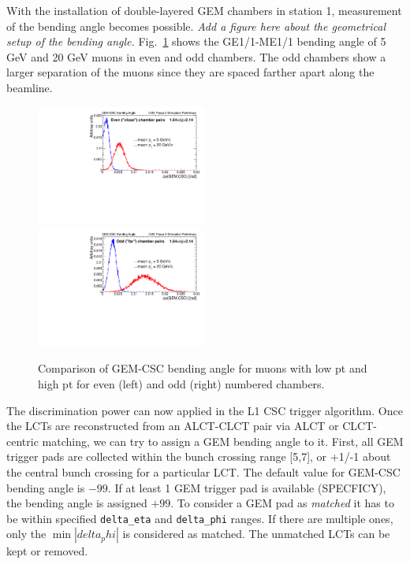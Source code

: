 With the installation of double-layered GEM chambers in station 1, measurement of the bending angle becomes possible. \textit{Add a figure here about the geometrical setup of the bending angle.} Fig.~\ref{fig:GEMCSCdPhi_chambers_reverse} shows the GE1/1-ME1/1 bending angle of 5 GeV and 20 GeV muons in even and odd chambers. The odd chambers show a larger separation of the muons since they are spaced farther apart along the beamline.

\begin{figure}[htb]
\includegraphics[width=0.5\textwidth]{figures/GEMCSCdPhi_even_chambers_reverse.pdf}
\includegraphics[width=0.5\textwidth]{figures/GEMCSCdPhi_odd_chambers_reverse.pdf}
\caption{Comparison of GEM-CSC bending angle for muons with low pt and high pt for even (left) and odd (right) numbered chambers.}
\label{fig:GEMCSCdPhi_chambers_reverse}
\end{figure}

The discrimination power can now applied in the L1 CSC trigger algorithm. Once the LCTs are reconstructed from an ALCT-CLCT pair via ALCT or CLCT-centric matching, we can try to assign a GEM bending angle to it. First, all GEM trigger pads are collected within the bunch crossing range [5,7], or +1/-1 about the central bunch crossing for a particular LCT. The default value for GEM-CSC bending angle is $-99$. If at least 1 GEM trigger pad is available (SPECFICY), the bending angle is assigned $+99$. To consider a GEM pad as \textit{matched} it has to be within specified \texttt{delta\_eta} and \texttt{delta\_phi} ranges. If there are multiple ones, only the $\min|delta_phi|$ is considered as matched. The unmatched LCTs can be kept or removed. 

